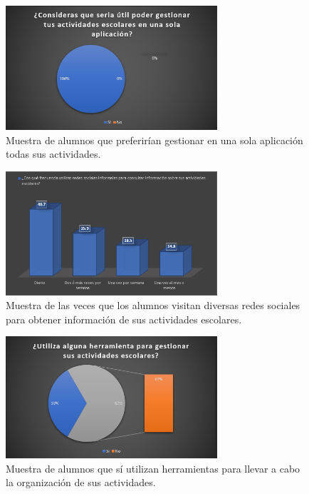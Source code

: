 \documentclass[10pt]{article}
\begin{document}
\par\vspace{\baselineskip}
\begin{figure}[H]
    \begin{center}
        \includegraphics[width=0.7\textwidth]{Imagenes/4.PNG}
        \caption{Muestra de alumnos que preferirían gestionar en una sola aplicación todas sus actividades.}
        \label{fig3}
    \end{center}
\end{figure}
\par\vspace{\baselineskip}
\begin{figure}[H]
    \begin{center}
        \includegraphics[width=0.7\textwidth]{Imagenes/5.PNG}
        \caption{Muestra de las veces que los alumnos visitan diversas redes sociales para obtener información de sus actividades escolares.}
        \label{fig4}
    \end{center}
\end{figure}
\par\vspace{\baselineskip}
\begin{figure}[H]
    \begin{center}
        \includegraphics[width=0.7\textwidth]{Imagenes/6.PNG}
        \caption{Muestra de alumnos que sí utilizan herramientas para llevar a cabo la organización de sus actividades.}
        \label{fig5}
    \end{center}
\end{figure}
\end{document}
